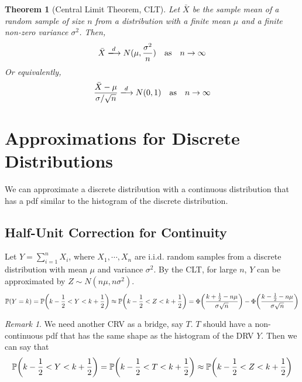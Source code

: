 \documentclass[10pt,UTF8]{article}
\newenvironment{definition box}
{\begin{tcolorbox}[colback=blue!5!white,colframe=blue!75!black,parbox=false,before upper=\par,before lower=\par]}
{\end{tcolorbox}}
\newenvironment{theorem box}
{\begin{tcolorbox}[colback=yellow!5!white,colframe=yellow!75!black,parbox=false,before upper=\par,before lower=\par]}
{\end{tcolorbox}}
\theoremstyle{definition}
\newtheorem{definition inner}{Definition}[section]
\theoremstyle{plain}
\newtheorem{theorem inner}{Theorem}[section]
\newenvironment{theorem}[1][]
{\begin{theorem box}\begin{theorem inner}[#1]\hfill\par}
{\end{theorem inner}\end{theorem box}}
\theoremstyle{definition}
\newtheorem*{proof inner}{\textit{Proof}}
\theoremstyle{remark}
\newtheorem*{remark}{\textit{Remark}}
\newcommand{\Prob}{\mathbb{P}\qty}
\begin{document}
\begin{theorem}[Central Limit Theorem, CLT]
    Let $\bar{X}$ be the sample mean of a random sample of size $n$ from a distribution
    with a finite mean $\mu$ and a finite non-zero variance $\sigma^2$.
    Then,
    \begin{equation*}
        \bar{X} \xlongrightarrow{d} N(\mu, \frac{\sigma^2}{n})
        \qas n \to \infty
    \end{equation*}
    Or equivalently,
    \begin{equation*}
        \frac{\bar{X}-\mu}{\sigma/\sqrt{n}}
        \xlongrightarrow{d} N(0,1)
        \qas n \to \infty
    \end{equation*}
\end{theorem}


\section{Approximations for Discrete Distributions}

We can approximate a discrete distribution with a continuous distribution
that has a pdf similar to the histogram of the discrete distribution.


\subsection{Half-Unit Correction for Continuity}

Let $Y=\sum_{i=1}^n X_i$, where $X_1,\cdots,X_n$ are i.i.d. random samples
from a discrete distribution with mean $\mu$ and variance $\sigma^2$.
By the CLT, for large $n$, $Y$ can be approximated by
$Z\sim N(n\mu,n\sigma^2)$.
\begin{equation*}
    \Prob(Y = k) = \Prob(k - \frac{1}{2} < Y < k + \frac{1}{2})
    \approx \Prob(k - \frac{1}{2} < Z < k + \frac{1}{2})
    = \Phi\!\left(\frac{k + \frac{1}{2} - n\mu}{\sigma\sqrt{n}}\right)
    - \Phi\!\left(\frac{k - \frac{1}{2} - n\mu}{\sigma\sqrt{n}}\right)
\end{equation*}
\begin{remark}
    We need another CRV as a bridge, say $T$.
    $T$ should have a non-continuous pdf
    that has the same shape as the histogram of the DRV $Y$.
    Then we can say that
    \begin{equation*}
        \Prob(k - \frac{1}{2} < Y < k + \frac{1}{2})
        = \Prob(k - \frac{1}{2} < T < k + \frac{1}{2})
        \approx \Prob(k - \frac{1}{2} < Z < k + \frac{1}{2})
    \end{equation*}
\end{remark}
\end{document}
